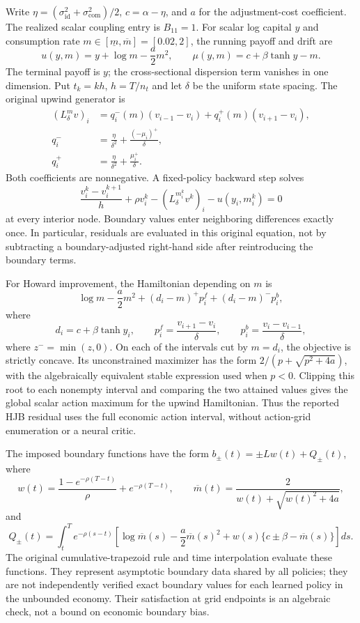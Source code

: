 Write $\eta=(\sigma_{\mathrm{id}}^2+\sigma_{\mathrm{com}}^2)/2$,
$c=\alpha-\eta$, and $a$ for the adjustment-cost coefficient. The realized
scalar coupling entry is $B_{11}=1$. For scalar log capital $y$ and consumption
rate $m\in[\underline m,\overline m]=[0.02,2]$, the running payoff and drift are
\[
 u(y,m)=y+\log m-\frac a2m^2,
 \qquad \mu(y,m)=c+\beta\tanh y-m.
\]
The terminal payoff is $y$; the cross-sectional dispersion term vanishes in
one dimension. Put $t_k=kh$, $h=T/n_t$ and let $\delta$ be the uniform state
spacing. The original upwind generator is
\begin{align*}
 (L^m_\delta v)_i
 &=q_i^-(m)(v_{i-1}-v_i)+q_i^+(m)(v_{i+1}-v_i),\\
 q_i^-&=\frac{\eta}{\delta^2}+\frac{(-\mu_i)^+}{\delta},\\
 q_i^+&=\frac{\eta}{\delta^2}+\frac{\mu_i^+}{\delta}.
\end{align*}
Both coefficients are nonnegative. A fixed-policy backward step solves
\[
 \frac{v_i^k-v_i^{k+1}}{h}+\rho v_i^k
 -(L^{m_i^k}_\delta v^k)_i-u(y_i,m_i^k)=0
\]
at every interior node. Boundary values enter neighboring differences exactly
once. In particular, residuals are evaluated in this original equation,
not by subtracting a boundary-adjusted right-hand side after reintroducing
the boundary terms.

For Howard improvement, the Hamiltonian depending on $m$ is
\[
 \log m-\frac a2m^2+(d_i-m)^+p_i^f+(d_i-m)^-p_i^b,
\]
where
\[
 d_i=c+\beta\tanh y_i,\qquad
 p_i^f=\frac{v_{i+1}-v_i}{\delta},\qquad
 p_i^b=\frac{v_i-v_{i-1}}{\delta},
\]
where $z^-=\min(z,0)$. On each of the intervals cut by $m=d_i$, the
objective is strictly concave. Its unconstrained maximizer has the form
$2/(p+\sqrt{p^2+4a})$, with the algebraically equivalent stable expression
used when $p<0$. Clipping this root to each nonempty interval and comparing
the two attained values gives the global scalar action maximum for the
upwind Hamiltonian. Thus the reported HJB residual uses the full economic
action interval, without action-grid enumeration or a neural critic.

The imposed boundary functions have the form
$b_\pm(t)=\pm Lw(t)+Q_\pm(t)$, where
\[
 w(t)=\frac{1-e^{-\rho(T-t)}}{\rho}+e^{-\rho(T-t)},\qquad
 \overline m(t)=\frac{2}{w(t)+\sqrt{w(t)^2+4a}},
\]
and
\[
 Q_\pm(t)=\int_t^T e^{-\rho(s-t)}
 \left[\log\overline m(s)-\frac a2\overline m(s)^2
       +w(s)\{c\pm\beta-\overline m(s)\}\right]ds.
\]
The original cumulative-trapezoid rule and time interpolation evaluate these
functions. They represent asymptotic boundary data shared by all policies;
they are not independently verified exact boundary values for each learned
policy in the unbounded economy. Their satisfaction at grid endpoints is
an algebraic check, not a bound on economic boundary bias.


